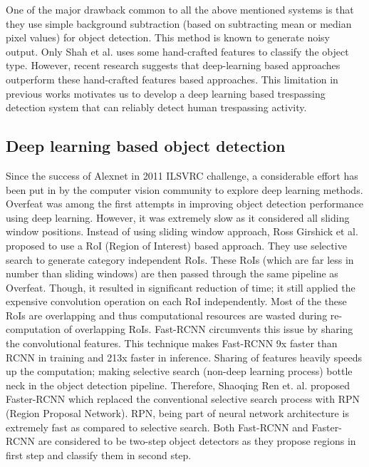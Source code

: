 One of the major drawback common to all the above mentioned systems is that they use simple background subtraction (based on subtracting mean or median pixel values) for object detection. This method is known to generate noisy output\cite{stauffer1999adaptive}. Only Shah et al.\cite{shah2007automated} uses some hand-crafted features to classify the object type. However, recent research suggests that deep-learning based approaches outperform these hand-crafted features based approaches\cite{benenson2014ten}. This limitation in previous works motivates us to develop a deep learning based trespassing detection system that can reliably detect human trespassing activity. 

\subsection{Deep learning based object detection}
Since the success of Alexnet\cite{krizhevsky2012imagenet} in 2011 ILSVRC\cite{russakovsky2015imagenet} challenge, a considerable effort has been put in by the computer vision community to explore deep learning methods. Overfeat\cite{sermanet2013overfeat} was among the first attempts in improving object detection performance using deep learning. However, it was extremely slow as it considered all sliding window positions. Instead of using sliding window approach, Ross Girshick et al.\cite{girshick2014rich} proposed to use a RoI (Region of Interest) based approach. They use selective search\cite{uijlings2013selective} to generate category independent RoIs. These RoIs (which are far less in number than sliding windows) are then passed through the same pipeline as Overfeat.  Though, it resulted in significant reduction of time; it still applied the expensive convolution operation on each RoI independently. Most of the these RoIs are overlapping and thus computational resources are wasted during re-computation of overlapping RoIs. Fast-RCNN\cite{girshick2015fast} circumvents this issue by sharing the convolutional features. This technique makes Fast-RCNN 9x faster than RCNN\cite{girshick2014rich} in training and 213x faster in inference\cite{girshick2015fast}. Sharing of features heavily speeds up the computation; making selective search (non-deep learning process) bottle neck in the object detection pipeline. Therefore, Shaoqing Ren et. al. proposed Faster-RCNN\cite{ren2015faster} which replaced the conventional selective search process with RPN (Region Proposal Network). RPN, being part of neural network architecture is extremely fast as compared to selective search. Both Fast-RCNN and Faster-RCNN are considered to be two-step object detectors as they propose regions in first step and classify them in second step.

